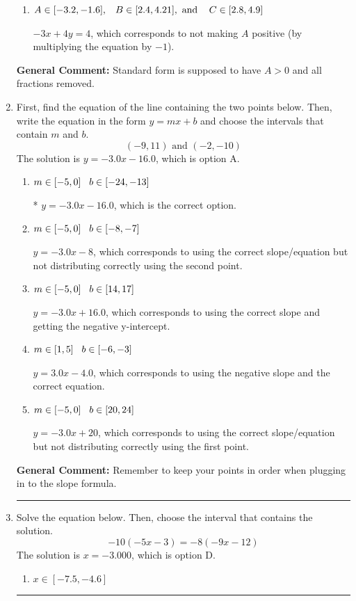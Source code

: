 \documentclass{extbook}[14pt]
\newcommand{\litem}[1]{\item #1

\rule{\textwidth}{0.4pt}}
\begin{document}
\begin{enumerate}
{\begin{enumerate}[label=\Alph*.]
 $-0.75x + 1y = 1.0$, which corresponds to not removing rational values for Standard Form.
\item \( A \in [-3.2, -1.6], \hspace{3mm} B \in [2.4, 4.21], \text{ and } \hspace{3mm} C \in [2.8, 4.9] \)

 $-3x + 4y = 4$, which corresponds to not making $A$ positive (by multiplying the equation by $-1$).
\end{enumerate}

\textbf{General Comment:} Standard form is supposed to have $A > 0$ and all fractions removed.
}
\litem{
First, find the equation of the line containing the two points below. Then, write the equation in the form $ y=mx+b $ and choose the intervals that contain $m$ and $b$.
\[ (-9, 11) \text{ and } (-2, -10) \]The solution is \( y = -3.0x -16.0 \), which is option A.\begin{enumerate}[label=\Alph*.]
\item \( m \in [-5, 0] \hspace*{3mm} b \in [-24, -13] \)

* $y = -3.0x -16.0$, which is the correct option.
\item \( m \in [-5, 0] \hspace*{3mm} b \in [-8, -7] \)

 $y = -3.0x -8$, which corresponds to using the correct slope/equation but not distributing correctly using the second point.
\item \( m \in [-5, 0] \hspace*{3mm} b \in [14, 17] \)

 $y = -3.0x + 16.0$, which corresponds to using the correct slope and getting the negative y-intercept.
\item \( m \in [1, 5] \hspace*{3mm} b \in [-6, -3] \)

 $y = 3.0x -4.0$, which corresponds to using the negative slope and the correct equation.
\item \( m \in [-5, 0] \hspace*{3mm} b \in [20, 24] \)

 $y = -3.0x + 20$, which corresponds to using the correct slope/equation but not distributing correctly using the first point.
\end{enumerate}

\textbf{General Comment:} Remember to keep your points in order when plugging in to the slope formula.
}
\litem{
Solve the equation below. Then, choose the interval that contains the solution.
\[ -10(-5x -3) = -8(-9x -12) \]The solution is \( x = -3.000 \), which is option D.\begin{enumerate}[label=\Alph*.]
\item \( x \in [-7.5, -4.6] \)


\end{enumerate}}
\end{enumerate}
\end{document}

